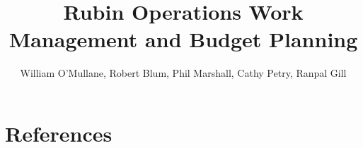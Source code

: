 \documentclass[DM,authoryear,toc]{lsstdoc}
\title{Rubin Operations Work Management and Budget Planning}
\author{%
William O'Mullane, Robert Blum, Phil Marshall, Cathy Petry, Ranpal Gill
}
\date{\vcsDate}
\begin{document}
\maketitle



\appendix

\section{References} \label{sec:bib}
\renewcommand{\refname}{} %


%
\printglossaries


\end{document}
